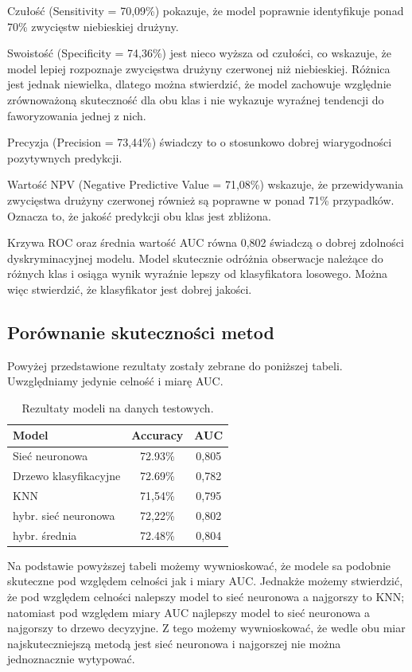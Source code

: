 \documentclass[twoside]{customStyle}
\newcommand{\getAccuracyKnn}{71,54}
\newcommand{\getAccuracyTree}{72.69}
\newcommand{\getAccuracyNn}{72.93}
\newcommand{\getAccuracyMixednn}{72,22}
\newcommand{\getaccuracyMixedsr}{72.48}
\newcommand{\getAucKnn}{0,795}
\newcommand{\getAucTree}{0,782}
\newcommand{\getAucNn}{0,805}
\newcommand{\getAucMixedNn}{0,802}
\newcommand{\getAucMixedSr}{0,804}
\begin{document}
Czułość (Sensitivity = 70,09\%) pokazuje, że model poprawnie identyfikuje ponad 70\% zwycięstw niebieskiej drużyny. 

Swoistość (Specificity = 74,36\%) jest nieco wyższa od czułości, co wskazuje, że model lepiej rozpoznaje zwycięstwa
drużyny czerwonej niż niebieskiej. Różnica jest jednak niewielka, dlatego można stwierdzić, że model zachowuje względnie zrównoważoną skuteczność dla obu klas i nie wykazuje wyraźnej tendencji do faworyzowania jednej z nich. 

Precyzja (Precision = 73,44\%) świadczy to o stosunkowo dobrej wiarygodności pozytywnych predykcji. 

Wartość NPV (Negative Predictive Value = 71,08\%) wskazuje, że przewidywania zwycięstwa drużyny czerwonej również są poprawne w ponad 71\% przypadków. Oznacza to, że jakość predykcji obu klas jest zbliżona.

Krzywa ROC oraz średnia wartość AUC równa 0,802 świadczą o dobrej zdolności dyskryminacyjnej modelu. Model skutecznie odróżnia obserwacje należące do różnych klas i osiąga wynik wyraźnie lepszy od klasyfikatora losowego. Można więc stwierdzić, że klasyfikator jest dobrej jakości.

\subsection{Porównanie skuteczności metod}

Powyżej przedstawione rezultaty zostały zebrane do poniższej tabeli. Uwzględniamy jedynie celność i miarę AUC.

\begin{table}[H]
  \centering
\begin{tabular}{l c c}
	\toprule
	\textbf{Model} & \textbf{Accuracy} &  \textbf{AUC}  \\
	\midrule
	Sieć neuronowa & \getAccuracyNn\% & \getAucNn \\ 
	Drzewo klasyfikacyjne & \getAccuracyTree\% & \getAucTree \\
	KNN  & \getAccuracyKnn\% & \getAucKnn \\
	hybr. sieć neuronowa  & \getAccuracyMixednn\% & \getAucMixedNn\\
      hybr. średnia & \getaccuracyMixedsr\% & \getAucMixedSr \\
	\bottomrule
\end{tabular}
\caption{Rezultaty modeli na danych testowych.}
\end{table}

Na podstawie powyższej tabeli możemy wywnioskować, że modele sa podobnie skuteczne pod względem celności jak i miary AUC. Jednakże możemy stwierdzić, że pod względem celności nalepszy model to sieć neuronowa a najgorszy to KNN; natomiast pod względem miary AUC najlepszy model to sieć neuronowa a najgorszy to drzewo decyzyjne. Z tego możemy wywnioskować, że wedle obu miar najskuteczniejszą metodą jest sieć neuronowa i najgorszej nie można jednoznacznie wytypować.
\end{document}
